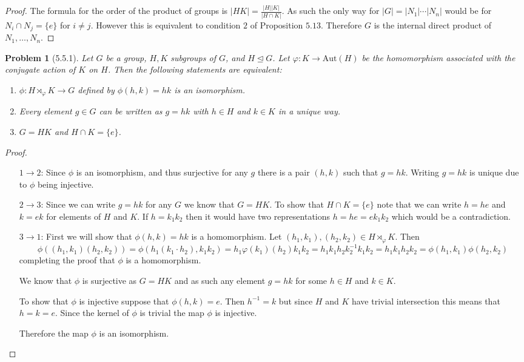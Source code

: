 \documentclass[10pt]{article}
\newcommand{\sk}{\vskip 10mm}
\theoremstyle{plain}
\newtheorem{problem}{Problem}
\theoremstyle{remark}
\begin{document}
\begin{proof}
  The formula for the order of the product of groups is
  $|HK|=\frac{|H||K|}{|H\cap K|}$. As such the only way for
  $|G|=|N_1|\cdots|N_n|$ would be for $N_i\cap N_j=\{e\}$ for $i\neq j$.
  However this is equivalent to condition $2$ of Proposition
  $5.13$. Therefore $G$ is the internal direct product of
  $N_1,\ldots,N_n$.
\end{proof}

\sk

\begin{problem}[5.5.1]
  Let $G$ be a group, $H,K$ subgroups of $G$, and $H\trianglelefteq G$. Let
  $\varphi:K\rightarrow \text{Aut}(H)$ be the homomorphism associated with the conjugate
  action of $K$ on $H$. Then the following statements are equivalent:
  \begin{enumerate}
  \item $\phi:H\rtimes_\varphi K\rightarrow G$ defined by $\phi(h,k)=hk$ is an isomorphism.
  \item Every element $g\in G$ can be written as $g=hk$ with $h\in H$ and $k\in K$
    in a unique way.
  \item $G=HK$ and $H\cap K=\{e\}$.
  \end{enumerate}
\end{problem}

\begin{proof}
  \begin{enumerate}
  \item[$1\rightarrow 2$:] Since $\phi$ is an isomorphism, and thus surjective
    for any $g$ there is a pair $(h,k)$ such that $g=hk$.
    Writing $g=hk$ is unique due to $\phi$ being injective.
  \item[$2\rightarrow 3$:] Since we can write $g=hk$ for any $G$ we
    know that $G=HK$. To show that $H\cap K = \{e\}$ note
    that we can write $h=he$ and $k=ek$ for elements of
    $H$ and $K$. If $h=k_1k_2$ then it would have
    two representations $h=he=ek_1k_2$ which would be a contradiction.
  \item[$3\rightarrow 1$:] First we will show that $\phi(h,k)=hk$ is a homomorphism.
    Let $(h_1,k_1),(h_2,k_2)\in H\rtimes_\varphi K$. Then
    \[ \phi((h_1,k_1)(h_2,k_2))=\phi(h_1(k_1\cdot h_2),k_1k_2)=h_1\varphi(k_1)(h_2)k_1k_2
      =h_1k_1h_2k_2^{-1}k_1k_2=h_1k_1h_2k_2 =\phi(h_1,k_1)\phi(h_2,k_2) \]
    completing the proof that $\phi$ is a homomorphism.

    We know that $\phi$ is surjective as $G=HK$ and as such any element
    $g=hk$ for some $h\in H$ and $k\in K$.

    To show that $\phi$ is injective suppose that $\phi(h,k)=e$. Then
    $h^{-1}=k$ but since $H$ and $K$ have trivial intersection
    this means that $h=k=e$. Since the kernel of $\phi$ is trivial
    the map $\phi$ is injective.

    Therefore the map $\phi$ is an isomorphism.
  \end{enumerate}
\end{proof}
\end{document}
